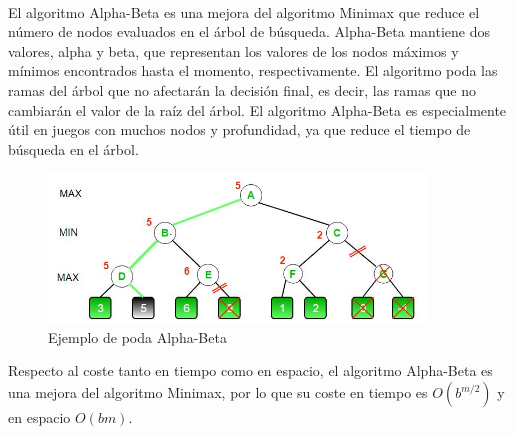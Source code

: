 \documentclass{report}
\begin{document}
          \paragraph*{}
          {
            El algoritmo Alpha-Beta es una mejora del algoritmo Minimax que reduce el número de nodos evaluados en el árbol de búsqueda. 
            Alpha-Beta mantiene dos valores, alpha y beta, que representan los valores de los nodos máximos y mínimos encontrados hasta el momento, respectivamente. 
            El algoritmo poda las ramas del árbol que no afectarán la decisión final, es decir, las ramas que no cambiarán el valor de la raíz del árbol.
            El algoritmo Alpha-Beta es especialmente útil en juegos con muchos nodos y profundidad, ya que reduce el tiempo de búsqueda en el árbol.
            
            \begin{figure}[H]
                \centering
                \includegraphics[width=0.9\textwidth]{./.img/alpha-beta.jpg}
                \caption{Ejemplo de poda Alpha-Beta}
            \end{figure}

            Respecto al coste tanto en tiempo como en espacio, el algoritmo Alpha-Beta es una mejora del algoritmo Minimax, por lo que su coste en tiempo es $O(b^{m/2})$ y en espacio $O(bm)$.
          }
\end{document}
